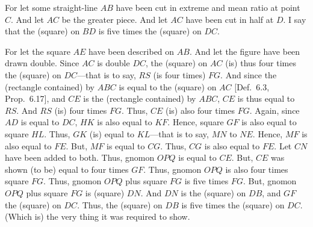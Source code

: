 \begin{Parallel}{}{}
{\epsfysize=2.5in
\centerline{}

For let some straight-line $AB$ have been cut in extreme and mean ratio
at point $C$. And let $AC$ be the greater piece. And let $AC$ have been
cut in half at $D$. I say that the (square) on $BD$ is five times the
(square) on $DC$. 

For let the square $AE$ have been described on $AB$. And let the
figure have been drawn double. Since $AC$ is double $DC$, the
(square) on $AC$ (is) thus four times the (square) on $DC$---that
is to say, $RS$ (is four times) $FG$. And since the (rectangle contained)
by $ABC$ is equal to the (square) on $AC$ [Def.~6.3, Prop.~6.17],
and $CE$ is the (rectangle contained) by $ABC$,  $CE$ is thus equal
to $RS$. And $RS$ (is) four times $FG$. Thus, $CE$ (is) also four times
$FG$. Again, since $AD$ is equal to $DC$, $HK$ is also equal to
$KF$. Hence, square $GF$ is also equal to square $HL$. Thus,
$GK$ (is) equal to $KL$---that is to say, $MN$ to $NE$. 
Hence, $MF$ is also equal to $FE$. But, $MF$ is equal to $CG$.
Thus, $CG$ is also equal to $FE$. Let $CN$ have been added to both.
Thus, gnomon $OPQ$ is equal to $CE$. But, $CE$ was shown (to be)
equal to four times $GF$. Thus, gnomon $OPQ$  is also four times
square $FG$. Thus, gnomon $OPQ$ plus square $FG$ is five times
$FG$. But, gnomon $OPQ$ plus square $FG$ is (square) $DN$. 
And  $DN$ is the (square) on $DB$, and $GF$ the (square)
on $DC$. Thus, the (square) on $DB$ is five times the (square)
on $DC$. (Which is) the very thing it was required to show.}
\end{Parallel}

